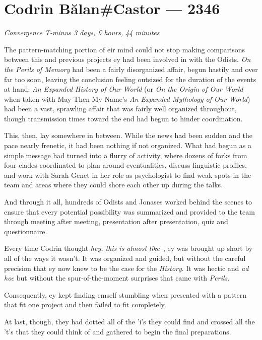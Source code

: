 \hypertarget{codrin-bux103lancastor-2346}{%
\chapter{Codrin Bălan\#Castor — 2346}\label{codrin-bux103lancastor-2346}}

\begin{center}
\emph{Convergence T-minus 3 days, 6 hours, 44 minutes}
\end{center}

\noindent The pattern-matching portion of eir mind could not stop making comparisons between this and previous projects ey had been involved in with the Odists. \emph{On the Perils of Memory} had been a fairly disorganized affair, begun hastily and over far too soon, leaving the conclusion feeling outsized for the duration of the events at hand. \emph{An Expanded History of Our World} (or \emph{On the Origin of Our World} when taken with May Then My Name's \emph{An Expanded Mythology of Our World}) had been a vast, sprawling affair that was fairly well organized throughout, though transmission times toward the end had begun to hinder coordination.

This, then, lay somewhere in between. While the news had been sudden and the pace nearly frenetic, it had been nothing if not organized. What had begun as a simple message had turned into a flurry of activity, where dozens of forks from four clades coordinated to plan around eventualities, discuss linguistic profiles, and work with Sarah Genet in her role as psychologist to find weak spots in the team and areas where they could shore each other up during the talks.

And through it all, hundreds of Odists and Jonases worked behind the scenes to ensure that every potential possibility was summarized and provided to the team through meeting after meeting, presentation after presentation, quiz and questionnaire.

Every time Codrin thought \emph{hey, this is almost like--}, ey was brought up short by all of the ways it wasn't. It was organized and guided, but without the careful precision that ey now knew to be the case for the \emph{History}. It was hectic and \emph{ad hoc} but without the spur-of-the-moment surprises that came with \emph{Perils}.

Consequently, ey kept finding emself stumbling when presented with a pattern that fit one project and then failed to fit completely.

At last, though, they had dotted all of the 'i's they could find and crossed all the 't's that they could think of and gathered to begin the final preparations.


